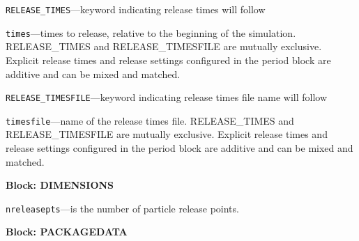 \begin{description}
\item \texttt{RELEASE\_TIMES}---keyword indicating release times will follow

\item \texttt{times}---times to release, relative to the beginning of the simulation.  RELEASE_TIMES and RELEASE_TIMESFILE are mutually exclusive.  Explicit release times and release settings configured in the period block are additive and can be mixed and matched.

\item \texttt{RELEASE\_TIMESFILE}---keyword indicating release times file name will follow

\item \texttt{timesfile}---name of the release times file.  RELEASE_TIMES and RELEASE_TIMESFILE are mutually exclusive.  Explicit release times and release settings configured in the period block are additive and can be mixed and matched.

\end{description}
\item \textbf{Block: DIMENSIONS}

\begin{description}
\item \texttt{nreleasepts}---is the number of particle release points.

\end{description}
\item \textbf{Block: PACKAGEDATA}

